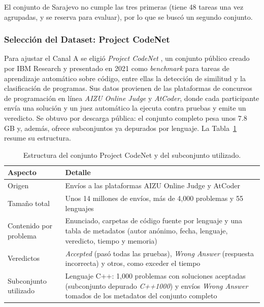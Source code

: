 El conjunto de Sarajevo no cumple las tres primeras (tiene 48 tareas una vez agrupadas, y se reserva para evaluar), por lo que se buscó un segundo conjunto.

\subsubsection{Selección del Dataset: Project CodeNet}
\label{subsec:origen_codenet}

Para ajustar el Canal A se eligió \textit{Project CodeNet} \cite{Puri2021CodeNet}, un conjunto público creado por IBM Research y presentado en 2021 como \textit{benchmark} para tareas de aprendizaje automático sobre código, entre ellas la detección de similitud y la clasificación de programas. Sus datos provienen de las plataformas de concursos de programación en línea \textit{AIZU Online Judge} y \textit{AtCoder}, donde cada participante envía una solución y un juez automático la ejecuta contra pruebas y emite un veredicto. Se obtuvo por descarga pública: el conjunto completo pesa unos 7.8 GB y, además, ofrece subconjuntos ya depurados por lenguaje. La Tabla~\ref{tab:dimensiones_codenet} resume su estructura.

\begin{table}[H]
    \centering
    \caption{Estructura del conjunto Project CodeNet y del subconjunto utilizado.}
    \label{tab:dimensiones_codenet}
    \begin{tabularx}{\textwidth}{|l|X|}
        \hline
        \textbf{Aspecto} & \textbf{Detalle} \\ \hline
        Origen & Envíos a las plataformas AIZU Online Judge y AtCoder \\ \hline
        Tamaño total & Unos 14 millones de envíos, más de 4,000 problemas y 55 lenguajes \\ \hline
        Contenido por problema & Enunciado, carpetas de código fuente por lenguaje y una tabla de metadatos (autor anónimo, fecha, lenguaje, veredicto, tiempo y memoria) \\ \hline
        Veredictos & \textit{Accepted} (pasó todas las pruebas), \textit{Wrong Answer} (respuesta incorrecta) y otros, como exceder el tiempo \\ \hline
        Subconjunto utilizado & Lenguaje C++: 1,000 problemas con soluciones aceptadas (subconjunto depurado \textit{C++1000}) y envíos \textit{Wrong Answer} tomados de los metadatos del conjunto completo \\ \hline
    \end{tabularx}
\end{table}

